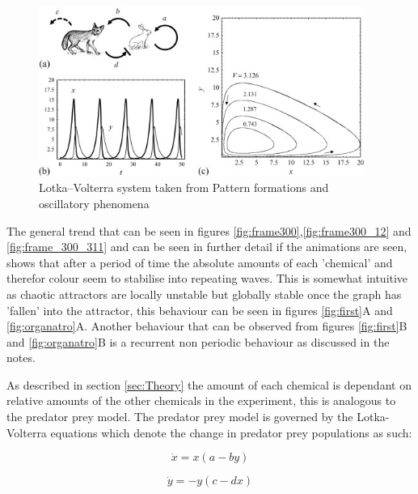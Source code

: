 \documentclass[12pt, A4]{article}
\begin{document}
\begin{figure}
  \begin{center}
    \includegraphics[width=0.95\textwidth]{pred_pray.jpg}
  \end{center}
  \caption{Lotka–Volterra system taken from Pattern formations and oscillatory phenomena\cite{kinoshita2013pattern}}
  \label{fig:pred_pray}
\end{figure}


The general trend that can be seen in figures \ref{fig:frame300},\ref{fig:frame300_12} and \ref{fig:frame_300_311}
and can be seen in further detail if the animations are seen, shows that after a period of time 
the absolute amounts of each 'chemical' and therefor colour seem to stabilise into repeating waves. 
This is somewhat intuitive as chaotic attractors are locally unstable but globally stable 
once the graph has 'fallen' into the attractor, this behaviour can be seen in figures 
\ref{fig:first}A and \ref{fig:organatro}A. Another behaviour that can be observed from figures 
\ref{fig:first}B and \ref{fig:organatro}B is a recurrent non periodic behaviour as discussed in the notes.

As described in section \ref{sec:Theory} the amount of each chemical is dependant on relative 
amounts of the other chemicals in the experiment, this is analogous to the predator prey model.
The predator prey model is governed by the Lotka-Volterra equations which denote the change in 
predator prey populations as such\cite{kinoshita2013pattern}:

\begin{equation}
  \dot{x}=x(a-by)
  \label{eq:LV1}
\end{equation}

\begin{equation}
  \dot{y}=-y(c-dx)
  \label{eq:LV2}
\end{equation}
\end{document}
